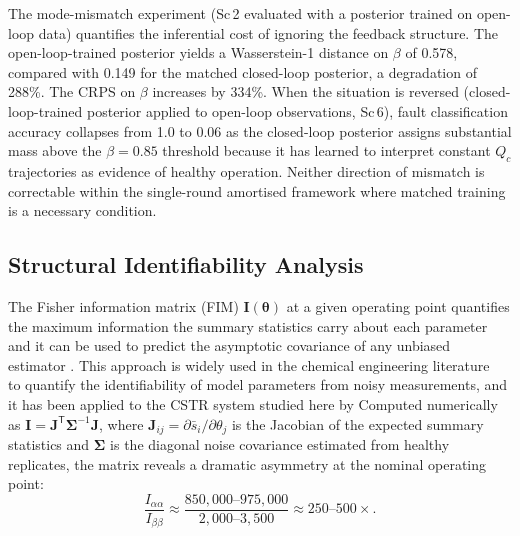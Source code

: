 \documentclass[aps,pre,twocolumn,superscriptaddress]{revtex4-2}
\begin{document}
\label{sec:model_mismatch_results}
The mode-mismatch experiment (Sc\,2 evaluated with a posterior trained on
open-loop data) quantifies the inferential cost of ignoring the feedback
structure.  The open-loop-trained posterior yields a Wasserstein-1 distance
on $\beta$ of 0.578, compared with 0.149 for the matched closed-loop posterior, a degradation of 288\%.  The CRPS on $\beta$ increases by 334\%.  When the
situation is reversed (closed-loop-trained posterior applied to open-loop
observations, Sc\,6), fault classification accuracy collapses from 1.0 to 0.06 as
the closed-loop posterior assigns substantial mass above the $\beta = 0.85$
threshold because it has learned to interpret constant $Q_c$ trajectories
as evidence of healthy operation.  Neither direction of mismatch is
correctable within the single-round amortised framework where matched training
is a necessary condition.

\subsection{Structural Identifiability Analysis}
\label{sec:identifiability}


The Fisher information matrix (FIM) $\mathbf{I}(\boldsymbol{\theta})$ at a given
operating point quantifies the maximum information the summary statistics carry
about each parameter~\citep{Rao1945} and it can be used to predict the asymptotic 
covariance of any unbiased estimator \citep{identifiability1990, identifiability2026}. 
This approach is widely used in the chemical engineering 
literature~\citep{Gevers2011,Bombois2006} to quantify the
identifiability of model parameters from noisy measurements, and it has been
applied to the CSTR system studied here by \citet{Forssell1999} 
Computed numerically as
$\mathbf{I} = \mathbf{J}^\mathsf{T}\boldsymbol{\Sigma}^{-1}\mathbf{J}$, where
$\mathbf{J}_{ij} = \partial\bar{s}_i/\partial\theta_j$ is the Jacobian of the
expected summary statistics and $\boldsymbol{\Sigma}$ is the diagonal noise
covariance estimated from healthy replicates, the matrix reveals a dramatic
asymmetry at the nominal operating point:
%
\begin{equation}
  \frac{I_{\alpha\alpha}}{I_{\beta\beta}} \approx \frac{850{,}000\text{--}975{,}000}{2{,}000\text{--}3{,}500} \approx 250\text{--}500\times.
  \label{eq:fim_ratio}
\end{equation}
%
\end{document}
